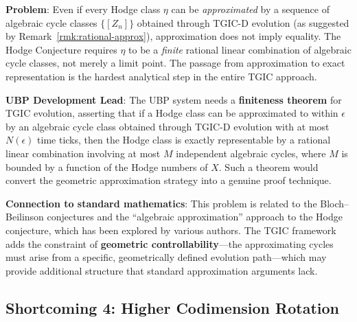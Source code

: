 \documentclass[11pt,a4paper]{article}
\theoremstyle{definition}
\theoremstyle{plain}
\begin{document}
\begin{tcolorbox}[colback=red!5, colframe=red!40!black, title={\textbf{Shortcoming 3: Approximation Does Not Imply Equality}}]
\textbf{Problem}: Even if every Hodge class $\eta$ can be \emph{approximated} by a sequence of algebraic cycle classes $\{[Z_n]\}$ obtained through TGIC-D evolution (as suggested by Remark~\ref{rmk:rational-approx}), approximation does not imply equality. The Hodge Conjecture requires $\eta$ to be a \emph{finite} rational linear combination of algebraic cycle classes, not merely a limit point. The passage from approximation to exact representation is the hardest analytical step in the entire TGIC approach.

\medskip
\textbf{UBP Development Lead}: The UBP system needs a \textbf{finiteness theorem} for TGIC evolution, asserting that if a Hodge class can be approximated to within $\epsilon$ by an algebraic cycle class obtained through TGIC-D evolution with at most $N(\epsilon)$ time ticks, then the Hodge class is exactly representable by a rational linear combination involving at most $M$ independent algebraic cycles, where $M$ is bounded by a function of the Hodge numbers of $X$. Such a theorem would convert the geometric approximation strategy into a genuine proof technique.

\medskip
\textbf{Connection to standard mathematics}: This problem is related to the Bloch--Beilinson conjectures and the ``algebraic approximation'' approach to the Hodge conjecture, which has been explored by various authors. The TGIC framework adds the constraint of \textbf{geometric controllability}---the approximating cycles must arise from a specific, geometrically defined evolution path---which may provide additional structure that standard approximation arguments lack.
\end{tcolorbox}

\subsection{Shortcoming 4: Higher Codimension Rotation}\label{sec:sc4}
\end{document}
